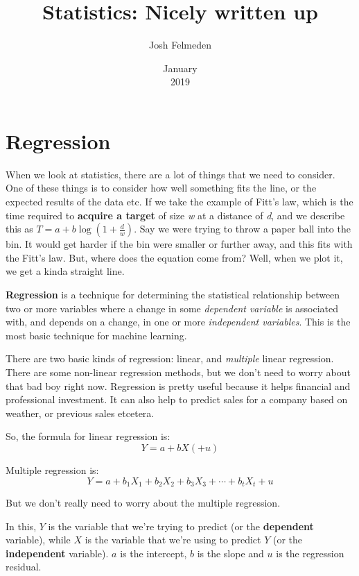 \documentclass[11pt,a4paper,titlepage]{scrartcl}
\author{Josh Felmeden}
\date{January \\ 2019}
\title{Statistics: Nicely written up}
\begin{document}
\maketitle
\tableofcontents
\newpage

\section{Regression}%
\label{sec:regression}
When we look at statistics, there are a lot of things that we need to
consider. One of these things is to consider how well something fits the
line, or the expected results of the data etc. If we take the example of
Fitt's law, which is the time required to \textbf{acquire a target} of
size \textit{w} at a distance of \textit{d}, and we describe this as $T =
a + b \log(1+ \frac{d}{w})$. Say we were trying to throw a paper ball into
the bin. It would get harder if the bin were smaller or further away, and
this fits with the Fitt's law. But, where does the equation come from?
Well, when we plot it, we get a kinda straight line. 

\textbf{Regression} is a technique for determining the statistical
relationship between two or more variables where a change in some
\textit{dependent variable} is associated with, and depends on a change,
in one or more \textit{independent variables}. This is the most basic
technique for machine learning.

There are two basic kinds of regression: linear, and \textit{multiple}
linear regression. There are some non-linear regression methods, but we
don't need to worry about that bad boy right now. Regression is pretty
useful because it helps financial and professional investment. It can also
help to predict sales for a company based on weather, or previous sales
etcetera.

So, the formula for linear regression is:
\begin{equation*}
    Y = a + bX (+ u)
\end{equation*}

Multiple regression is:
\begin{equation*}
    Y = a + b_1 X_1 + b_2 X_2 + b_3 X_3 + \cdots + b_t X_t + u
\end{equation*}

But we don't really need to worry about the multiple regression.

In this, $Y$ is the variable that we're trying to predict (or the
\textbf{dependent} variable), while $X$ is the variable that we're using
to predict $Y$ (or the \textbf{independent} variable). $a$ is the
intercept, $b$ is the slope and $u$ is the regression residual.
\end{document}
